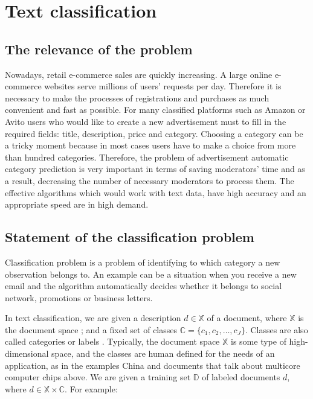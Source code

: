 \chapter{Text classification} \label{chapt1}

\section{The relevance of the problem} \label{sect1_1}

Nowadays, retail e-commerce sales are quickly increasing. A large online e-commerce
websites serve millions of users’ requests per day. Therefore it is necessary to make the processes of registrations and purchases as much convenient and fast as possible. For many classified platforms such as Amazon or Avito users who would like to create a new advertisement must to fill in the required fields: title, description, price and category. Choosing a category can be a tricky moment because in most cases users have to make a choice from more than hundred categories. Therefore, the problem  of advertisement automatic category prediction is very important in terms of saving moderators' time and as a result, decreasing the number of necessary moderators to process them. The effective algorithms which would work with text data, have high accuracy and an appropriate speed are in high demand.

\section{Statement of the classification problem} \label{sect1_2}


Classification problem is a problem of identifying to which category a new observation belongs to. An example can be a situation when you receive a new email and the algorithm automatically decides whether it belongs to social network, promotions or business letters.


\newcommand{\docsetlabeled}{\mathbb{D}}

In text classification, we are given a description  $d \in \mathbb{X}$ of a document, where $\mathbb{X}$ is the document space ; and a fixed set of classes  $\mathbb{C} = \{ c_1,c_2,\ldots,c_J \}$. Classes are also called categories or labels . Typically, the document space  $\mathbb{X}$ is some type of high-dimensional space, and the classes are human defined for the needs of an application, as in the examples China and documents that talk about multicore computer chips above. We are given a training set  $\docsetlabeled$ of labeled documents  $d $, where  $d \in \mathbb{X} \times \mathbb{C}$. For example: 

